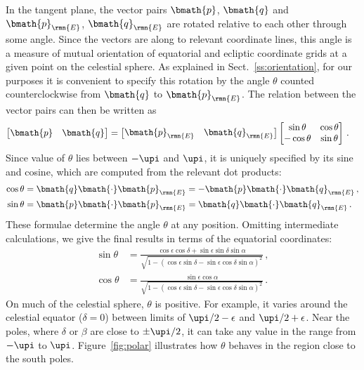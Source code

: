 \documentclass[fleqn,usenatbib,useAMS,usedcolumn]{mnras}
\begin{document}
In the tangent plane, the vector pairs $\bmath{p}$, $\bmath{q}$ and $\bmath{p}_\rmn{E}$, $\bmath{q}_\rmn{E}$ are rotated relative to each other through some angle. Since the vectors are along to relevant coordinate lines, this angle is a measure of mutual orientation of equatorial and ecliptic coordinate grids at a given point on the celestial sphere. As explained in Sect.~\ref{ss:orientation}, for our purposes it is convenient to specify this rotation by the angle $\theta$ counted counterclockwise from $\bmath{q}$ to $\bmath{p}_\rmn{E}$. The relation between the vector pairs can then be written as
\begin{align}\label{eq:pq-pairs}
  \begin{bmatrix}
    \bmath{p} & \bmath{q}
  \end{bmatrix}
  &=
  \begin{bmatrix}
    \bmath{p}_\rmn{E} & \bmath{q}_\rmn{E}
  \end{bmatrix}
  \begin{bmatrix}
     \sin\theta & \cos\theta \\
    -\cos\theta & \sin\theta \\
  \end{bmatrix}\,.
\end{align}
Since value of $\theta$ lies between $-\upi$ and $\upi$, it is uniquely specified by its sine and cosine, which are computed from the relevant dot products:
\begin{align}
  \label{eq:app-cos-theta}
  \cos\theta &=\bmath{q}\bmath{\cdot}\bmath{p}_\rmn{E}=-\bmath{p}\bmath{\cdot}\bmath{q}_\rmn{E}\,,\\
  \label{eq:app-sin-theta}
  \sin\theta &=\bmath{p}\bmath{\cdot}\bmath{p}_\rmn{E}=\bmath{q}\bmath{\cdot}\bmath{q}_\rmn{E}\,.
\end{align}
These formulae determine the angle $\theta$ at any position. Omitting intermediate calculations, we give the final results in terms of the equatorial coordinates:
\begin{align}
 \sin\theta&=
  \frac{\cos\epsilon\cos\delta+\sin\epsilon\sin\delta\sin\alpha}
       {\sqrt{1-\left(\cos\epsilon\sin\delta-\sin\epsilon\cos\delta\sin\alpha\right)^2}}\,,\\
 \cos\theta&=
  \frac{\sin\epsilon\cos\alpha}
       {\sqrt{1-\left(\cos\epsilon\sin\delta-\sin\epsilon\cos\delta\sin\alpha\right)^2}}\,.
\end{align}
On much of the celestial sphere, $\theta$ is positive. For example, it varies around the celestial equator ($\delta=0$) between limits of $\upi/2-\epsilon$ and $\upi/2+\epsilon$. Near the poles, where $\delta$ or $\beta$ are close to $\pm\upi/2$, it can take any value in the range from $-\upi$ to $\upi$. Figure~\ref{fig:polar} illustrates how $\theta$ behaves in the region close to the south poles.
\end{document}
